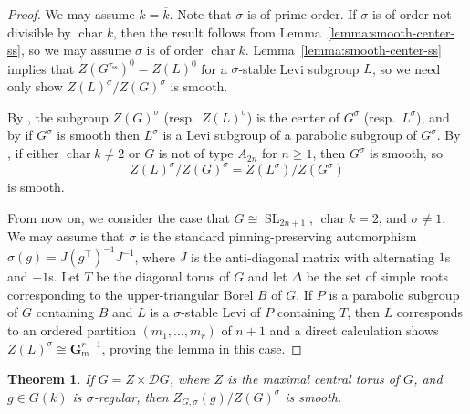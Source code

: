 \documentclass[11pt,reqno]{amsart}
\newtheorem{theorem}{Theorem}[section]
\theoremstyle{definition}
\renewcommand{\rm}{\mathrm}
\newcommand{\bG}{{\mathbf G}}
\newcommand{\sD}{{\mathscr D}}
\newcommand{\bGm}{\bG_{\rm{m}}}
\DeclareMathOperator{\chara}{char}
\DeclareMathOperator{\SL}{SL}
\newcommand{\ov}[1]{\overline{#1}}
\begin{document}
\begin{proof}
    We may assume $k = \ov{k}$.
    Note that $\sigma$ is of prime order. If $\sigma$ is of order not divisible by $\chara k$, then the result follows from Lemma~\ref{lemma:smooth-center-ss}, so we may assume $\sigma$ is of order $\chara k$. Lemma~\ref{lemma:smooth-center-ss} implies that $Z(G^{\tau_{\rm{ss}}})^0 = Z(L)^0$ for a $\sigma$-stable Levi subgroup $L$, so we need only show $Z(L)^\sigma/Z(G)^\sigma$ is smooth.
    
    By \cite[Lemma 6.7]{ALRR}, the subgroup $Z(G)^\sigma$ (resp.\ $Z(L)^\sigma$) is the center of $G^\sigma$ (resp.\ $L^\sigma$), and by \cite[Lemma 6.5]{ALRR} if $G^\sigma$ is smooth then $L^\sigma$ is a Levi subgroup of a parabolic subgroup of $G^\sigma$. By \cite[Theorem 5.1, Remark 5.3]{ALRR}, if either $\chara k \neq 2$ or $G$ is not of type $A_{2n}$ for $n \geq 1$, then $G^\sigma$ is smooth, so
    \[
    Z(L)^\sigma/Z(G)^\sigma = Z(L^\sigma)/Z(G^\sigma)
    \]
    is smooth.
    
    From now on, we consider the case that $G \cong \SL_{2n+1}$, $\chara k = 2$, and $\sigma \neq 1$. We may assume that $\sigma$ is the standard pinning-preserving automorphism $\sigma(g) = J(g^\top)^{-1}J^{-1}$, where $J$ is the anti-diagonal matrix with alternating $1$s and $-1$s. Let $T$ be the diagonal torus of $G$ and let $\Delta$ be the set of simple roots corresponding to the upper-triangular Borel $B$ of $G$. If $P$ is a parabolic subgroup of $G$ containing $B$ and $L$ is a $\sigma$-stable Levi of $P$ containing $T$, then $L$ corresponds to an ordered partition $(m_1, \dots, m_r)$ of $n+1$ and a direct calculation shows $Z(L)^\sigma \cong \bGm^{r-1}$, proving the lemma in this case.
\end{proof}


\begin{theorem}\label{theorem:smoothness-of-twisted-centralizers}
    If $G = Z \times \sD G$, where $Z$ is the maximal central torus of $G$, and $g \in G(k)$ is $\sigma$-regular, then $Z_{G,\sigma}(g)/Z(G)^\sigma$ is smooth.
\end{theorem}
\end{document}
